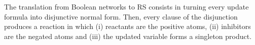 The translation from Boolean networks to RS consists in turning every update formula into disjunctive normal form. Then, every clause of the disjunction produces a reaction in which (i) reactants are the positive atoms, (ii) inhibitors are the negated atoms and (iii) the updated variable forms a singleton product. 
%
%
